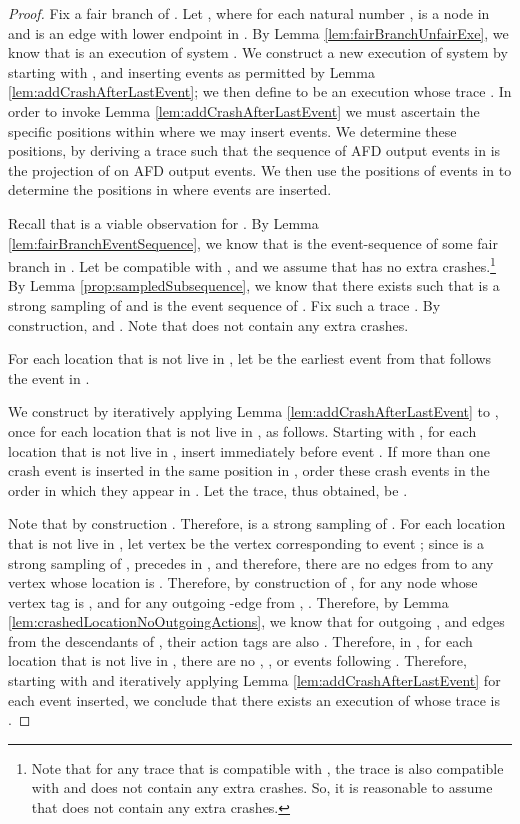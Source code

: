 \documentclass[11pt]{article}
\numberwithin{theorem}{section}
\begin{document}
\begin{proof}
Fix a fair branch  of . Let , where for each natural number ,  is a node in  and  is an edge with lower endpoint  in .
By Lemma \ref{lem:fairBranchUnfairExe}, we know that  is an execution of system . 
We construct a new execution  of system  by starting with , and inserting  events as permitted by Lemma \ref{lem:addCrashAfterLastEvent}; we then define  to be an execution whose trace . In order to invoke Lemma \ref{lem:addCrashAfterLastEvent} we must ascertain the specific positions within  where we may insert  events. We determine these positions, by deriving a trace  such that the sequence of AFD output events in  is the projection of  on AFD output events. We then use the positions of  events in  to determine the positions in  where  events are inserted.

Recall that  is a viable observation for . By Lemma \ref{lem:fairBranchEventSequence}, we know that  is the event-sequence of some fair branch  in . Let  be compatible with , and we assume that  has no extra crashes.\footnote{Note that for any trace  that is compatible with , the trace  is also compatible with  and does not contain any extra crashes. So, it is reasonable to assume that  does not contain any extra crashes.}
By Lemma \ref{prop:sampledSubsequence}, we know that there exists  such that  is a strong sampling of  and  is the event sequence of . Fix such a trace . By construction,  and . Note that  does not contain any extra crashes.

For each location  that is not live in , let  be the earliest event from  that follows the  event in .

We construct  by iteratively applying Lemma \ref{lem:addCrashAfterLastEvent} to , once for each location  that is not live in , as follows. Starting with  , for each location  that is not live in , insert  immediately before event . If more than one crash event is inserted in the same position in , order these crash events in the order in which they appear in .
Let the trace, thus obtained, be . 

Note that by construction . Therefore,  is a strong sampling of . For each location  that is not live in , let vertex  be the vertex corresponding to event ; since  is a strong sampling of ,  precedes  in , and therefore, there are no edges from  to any vertex whose location is . Therefore, by construction of , for any node  whose vertex tag is , and for any outgoing -edge  from , . Therefore, by Lemma \ref{lem:crashedLocationNoOutgoingActions}, we know that for outgoing ,  and  edges from the descendants  of , their action tags are also . Therefore, in , for each location  that is not live in , there are no , , or  events following .
Therefore, starting with  and iteratively applying Lemma \ref{lem:addCrashAfterLastEvent} for each  event inserted, we conclude that there exists an execution  of  whose trace is .


\end{proof}
\end{document}
